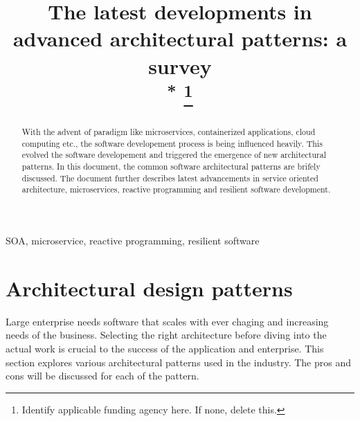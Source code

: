 \documentclass[conference]{IEEEtran}
\begin{document}
\title{The latest developments in advanced architectural patterns: a survey\\
{\footnotesize \textsuperscript{*}}
\thanks{Identify applicable funding agency here. If none, delete this.}
}

\author{
\and
{}
}

\maketitle

\begin{abstract}
With the advent of paradigm like microservices, containerized applications, cloud computing etc., the software developement process is being influenced heavily. This evolved the software developement and triggered the emergence of new architectural patterns. In this document, the common software architectural patterns are brifely discussed. The document further describes latest advancements in service oriented architecture, microservices, reactive programming and resilient software development.
\end{abstract}

\begin{IEEEkeywords}
SOA, microservice, reactive programming, resilient software
\end{IEEEkeywords}

\section{Architectural design patterns}
Large enterprise needs software that scales with ever chaging and increasing needs of the business. Selecting the right architecture before diving into the actual work is crucial to the success of the application and enterprise. This section explores various architectural patterns used in the industry. The pros and cons will be discussed for each of the pattern.
\end{document}
